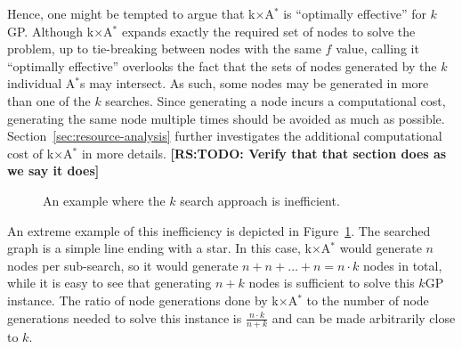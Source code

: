 \documentclass[twoside,11pt]{article}
\newcommand{\kgs}{$k$GP\xspace}
\newcommand{\astar}{A$^*$\xspace}
\newcommand{\kxastar}{k$\times$A$^*$\xspace}
\newcommand{\roni}[1]{\textbf{[RS:#1]}}
\begin{document}

Hence, one might be tempted to argue that \kxastar is ``optimally effective'' for \kgs.
Although \kxastar expands exactly the required set of nodes to solve the problem, up to tie-breaking between nodes with the same $f$ value, calling it ``optimally effective'' overlooks the fact that the sets of nodes generated by the $k$ individual \astar{}s may intersect.
As such, some nodes may be generated in more than one of the $k$ searches.
Since generating a node incurs a computational cost, generating the same node multiple times should be avoided as much as possible. 
Section~\ref{sec:resource-analysis} further investigates the additional computational cost of \kxastar in more details. 
\roni{TODO: Verify that that section does as we say it does}
 
\begin{figure}
  \centering
  \caption{An example where the $k$ search approach is inefficient.}
  \label{fig:k-search-bad}
\end{figure}
An extreme example of this inefficiency is depicted in Figure~\ref{fig:k-search-bad}.
The searched graph is a simple line ending with a star. %
In this case, \kxastar would generate $n$ nodes per sub-search, so it would generate $n + n + \dots + n = n\cdot k$ nodes in total, while it is easy to see that generating $n + k$ nodes is sufficient to solve this \kgs instance. %
The ratio of node generations done by \kxastar to the number of node generations needed to solve this instance is $\frac{n\cdot k}{n + k}$ and can be made arbitrarily close to $k$.
\end{document}

